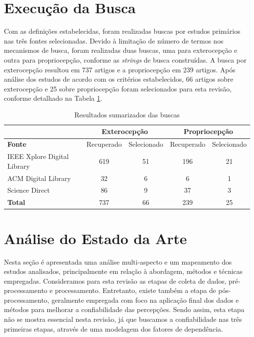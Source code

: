 \section{Execução da Busca}

Com as definições estabelecidas, foram realizadas buscas por estudos primários nas três fontes selecionadas. Devido à limitação de número de termos nos mecanismos de busca, foram realizadas duas buscas, uma para exterocepção e outra para propriocepção, conforme as \textit{strings} de busca construídas. A busca por exterocepção resultou em 737 artigos e a propriocepção em 239 artigos. Após análise dos estudos de acordo com os critérios estabelecidos, 66 artigos sobre exterocepção e 25 sobre propriocepção foram selecionados para esta revisão, conforme detalhado na Tabela \ref{tabela:resultados_sumarizados_busca}. 

\begin{table}[h]
    \caption{Resultados sumarizados das buscas}
    \label{tabela:resultados_sumarizados_busca}
    \centering
    \small
    \begin{tabular}{lcccc}
    \cmidrule(l){2-5} & \multicolumn{2}{c}{\textbf{Exterocepção}} & \multicolumn{2}{c}{\textbf{Propriocepção}} \\ \midrule
    \textbf{Fonte} & Recuperado & Selecionado & Recuperado & Selecionado \\ \midrule
    IEEE Xplore Digital Library & 619 & 51 & 196 & 21 \\ \midrule
    ACM Digital Library & 32 & 6 & 6 & 1 \\ \midrule
    Science Direct & 86 & 9 & 37 & 3 \\ \midrule
    \textbf{Total} & 737 & 66 & 239 & 25 \\ \bottomrule
    \end{tabular}
\end{table}

\section{Análise do Estado da Arte}

Nesta seção é apresentada uma análise multi-aspecto e um mapeamento dos estudos analisados, principalmente em relação à abordagem, métodos e técnicas empregadas. Consideramos para esta revisão as etapas de coleta de dados, pré-processamento e processamento. Entretanto, existe também a etapa de pós-processamento, geralmente empregada com foco na aplicação final dos dados e métodos para melhorar a confiabilidade das percepções. Sendo assim, esta etapa não se mostra essencial nesta revisão, já que buscamos a confiabilidade nas três primeiras etapas, através de uma modelagem dos fatores de dependência. 

